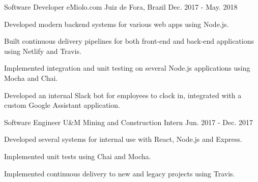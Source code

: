 \begin{cventries}
  \cventry
    {Software Developer} %
    {eMiolo.com} %
    {Juiz de Fora, Brazil} %
    {Dec. 2017 - May. 2018} %
    {
      \begin{cvitems} %
        \item {Developed modern backend systems for various web apps using Node.js.}
        \item {Built continuous delivery pipelines for both front-end and back-end applications using Netlify and Travis.}
        \item {Implemented integration and unit testing on several Node.js applications using Mocha and Chai.}
        \item {Developed an internal Slack bot for employees to clock in, integrated with a custom Google Assistant application.}
      \end{cvitems}
    }

  \cventry
    {Software Engineer} %
    {U\&M Mining and Construction} %
    {Intern} %
    {Jun. 2017 - Dec. 2017} %
    {
      \begin{cvitems} %
        \item {Developed several systems for internal use with React, Node.js and Express.}
        \item {Implemented unit tests using Chai and Mocha.}
        \item {Implemented continuous delivery to new and legacy projects using Travis.}
      \end{cvitems}
    }

\end{cventries}
